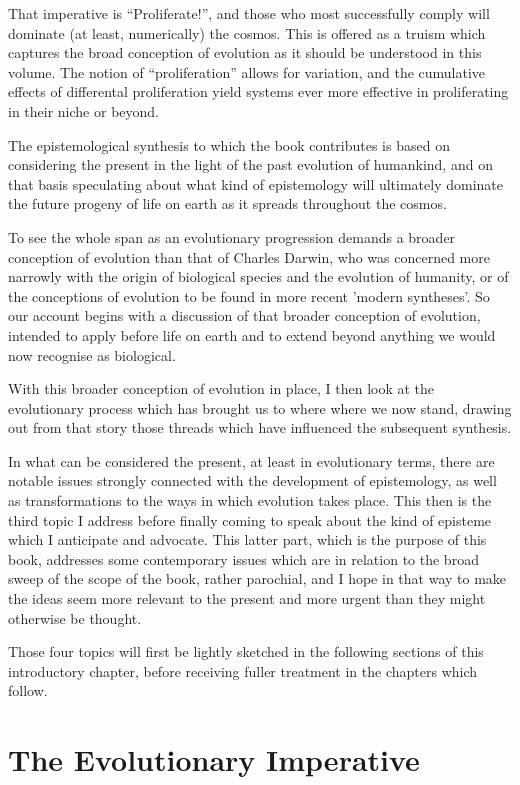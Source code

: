 {That imperative is ``Proliferate!'', and those who most successfully comply will dominate (at least, numerically) the cosmos.
This is offered as a truism which captures the broad conception of evolution as it should be understood in this volume.
The notion of ``proliferation'' allows for variation, and the cumulative effects of differental proliferation yield systems ever more effective in proliferating in their niche or beyond.

The epistemological synthesis to which the book contributes is based on considering the present in the light of the past evolution of humankind, and on that basis speculating about what kind of epistemology will ultimately dominate the future progeny of life on earth as it spreads throughout the cosmos.

To see the whole span as an evolutionary progression demands a broader conception of evolution than that of Charles Darwin, who was concerned more narrowly with the origin of biological species and the evolution of humanity, or of the conceptions of evolution to be found in more recent 'modern syntheses'.
So our account begins with a discussion of that broader conception of evolution, intended to apply before life on earth and to extend beyond anything we would now recognise as biological.

With this broader conception of evolution in place, I then look at the evolutionary process which has brought us to where where we now stand, drawing out from that story those threads which have influenced the subsequent synthesis.

In what can be considered the present, at least in evolutionary terms, there are notable issues strongly connected with the development of epistemology, as well as transformations to the ways in which evolution takes place.
This then is the third topic I address before finally coming to speak about the kind of episteme which I anticipate and advocate.
This latter part, which is the purpose of this book, addresses some contemporary issues which are in relation to the broad sweep of the scope of the book, rather parochial, and I hope in that way to make the ideas seem more relevant to the present and more urgent than they might otherwise be thought.

Those four topics will first be lightly sketched in the following sections of this introductory chapter, before receiving fuller treatment in the chapters which follow.

\section{The Evolutionary Imperative}

}
